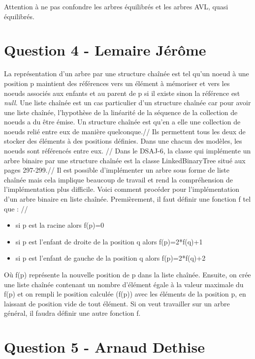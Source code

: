 \documentclass[10pt,a4paper]{article}
\begin{document}
	Attention à ne pas confondre les arbres équilibrés et les arbres AVL, quasi équilibrés.


\section*{Question 4 - Lemaire Jérôme}

La représentation d'un arbre par une structure chaînée est tel qu'un noeud à une position p maintient des références vers un élément à mémoriser et vers les noeuds associés aux enfants et au parent de p si il existe sinon la référence est \textit{null}. Une liste chaînée est un cas particulier d'un structure chaînée car pour avoir une liste chaînée, l'hypothèse de la linéarité de la séquence de la collection de noeuds a du être émise. Un structure chaînée est qu'en a elle une collection de noeuds relié entre eux de manière quelconque.//
Ils permettent tous les deux de stocker des éléments à des positions définies. Dans une chacun des modèles, les noeuds sont référencés entre eux. //
Dans le DSAJ-6, la classe qui implémente un arbre binaire par une structure chaînée est la classe LinkedBinaryTree situé aux pages 297-299.//
Il est possible d'implémenter un arbre sous forme de liste chaînée mais cela implique beaucoup de travail et rend la compréhension de l'implémentation plus difficile. Voici comment procéder pour l'implémentation d'un arbre binaire en liste chaînée. Premièrement, il faut définir une fonction f tel que : //
\begin{itemize}
	\item si p est la racine alors f(p)=0
	\item si p est l'enfant de droite de la position q alors f(p)=2*f(q)+1
	\item si p est l'enfant de gauche de la position q alors f(p)=2*f(q)+2
\end{itemize}
Où f(p) représente la nouvelle position de p dans la liste chaînée. Ensuite, on crée une liste chaînée contenant un nombre d'élément égale à la valeur maximale du f(p) et on rempli le position calculée (f(p)) avec les éléments de la position p, en laissant de position vide de tout élément. Si on veut travailler sur un arbre général, il faudra définir une autre fonction f.




\section*{Question 5 - Arnaud Dethise}
\end{document}
